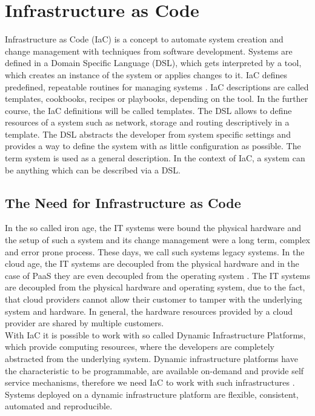 \chapter{Infrastructure as Code}
\label{cha:iac}
Infrastructure as Code (IaC) is a concept to automate system creation and change management with techniques from software development. Systems are defined in a Domain Specific Language (DSL), which gets interpreted by a tool, which creates an instance of the system or applies changes to it. IaC defines predefined, repeatable routines for managing systems \cite{Morris2016}. IaC descriptions are called templates, cookbooks, recipes or playbooks, depending on the tool. In the further course, the IaC definitions will be called templates. The DSL allows to define resources of a system such as network, storage and routing descriptively in a template. The DSL abstracts the developer from system specific settings and provides a way to define the system with as little configuration as possible. The term system is used as a general description. In the context of IaC, a system can be anything which can be described via a DSL.

\section{The Need for Infrastructure as Code}
\label{sec:iac-need}
In the so called iron age, the IT systems were bound the physical hardware and the setup of such a system and its change management were a long term, complex and error prone process. These days, we call such systems legacy systems. In the cloud age, the IT systems are decoupled from the physical hardware and in the case of PaaS they are even decoupled from the operating system \cite{Morris2016}. The IT systems are decoupled from the physical hardware and operating system, due to the fact, that cloud providers cannot allow their customer to tamper with the underlying system and hardware. In general, the hardware resources provided by a cloud provider are shared by multiple customers. \\

With IaC it is possible to work with so called Dynamic Infrastructure Platforms, which provide computing resources, where the developers are completely abstracted from the underlying system. Dynamic infrastructure platforms have the characteristic to be programmable, are available on-demand and provide self service mechanisms, therefore we need IaC to work with such infrastructures \cite{Morris2016}. Systems deployed on a dynamic infrastructure platform are flexible, consistent, automated and reproducible. \\

